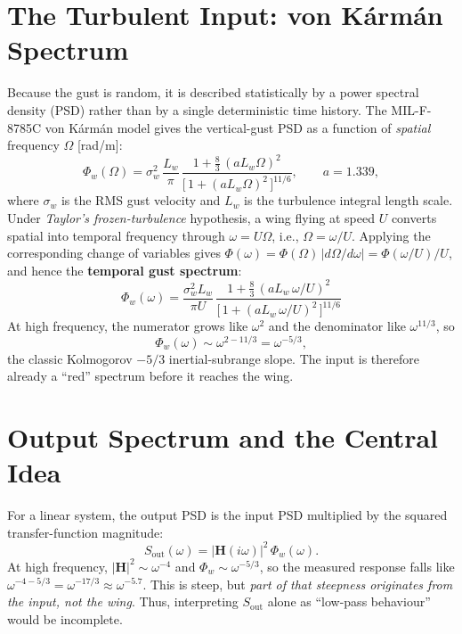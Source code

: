 \documentclass[11pt]{article}
\begin{document}
\section{The Turbulent Input: von K\'arm\'an Spectrum}
Because the gust is random, it is described statistically by a power spectral
density (PSD) rather than by a single deterministic time history. The MIL-F-8785C
von K\'arm\'an model gives the vertical-gust PSD as a function
of \emph{spatial} frequency $\Omega$ [rad/m]:
\begin{equation}
\Phi_w(\Omega)=\sigma_w^2\,\frac{L_w}{\pi}\,
\frac{1+\tfrac83\,(a L_w\Omega)^2}{\big[\,1+(a L_w\Omega)^2\,\big]^{11/6}},
\qquad a=1.339,
\label{eq:vk-space}
\end{equation}
where $\sigma_w$ is the RMS gust velocity and $L_w$ is the turbulence integral length scale. Under \emph{Taylor's frozen-turbulence} hypothesis, a wing flying at speed $U$ converts spatial
into temporal frequency through $\omega=U\Omega$, i.e., $\Omega=\omega/U$. Applying the corresponding change of variables gives
$\Phi(\omega)=\Phi(\Omega)\,|d\Omega/d\omega|=\Phi(\omega/U)/U$, and hence the
\textbf{temporal gust spectrum}:
\begin{equation}
\boxed{\;\Phi_w(\omega)=\frac{\sigma_w^2 L_w}{\pi U}\,
\frac{1+\tfrac83\,(a L_w\,\omega/U)^2}{\big[\,1+(a L_w\,\omega/U)^2\,\big]^{11/6}}\;}
\label{eq:vk-time}
\end{equation}
At high frequency, the numerator grows like $\omega^2$ and the denominator like
$\omega^{11/3}$, so
\begin{equation}
\Phi_w(\omega)\sim\omega^{2-11/3}=\omega^{-5/3},
\end{equation}
the classic Kolmogorov $-5/3$ inertial-subrange slope. The input is therefore already a
``red'' spectrum before it reaches the wing.

\section{Output Spectrum and the Central Idea}
For a linear system, the output PSD is the input PSD multiplied by the squared
transfer-function magnitude:
\begin{equation}
\boxed{\ S_{\mathrm{out}}(\omega) = \big|\mathbf H(i\omega)\big|^2\,\Phi_w(\omega).\ }
\label{eq:Sout}
\end{equation}
At high frequency, $|\mathbf H|^2\sim\omega^{-4}$ and $\Phi_w\sim\omega^{-5/3}$,
so the measured response falls like $\omega^{-4-5/3}=\omega^{-17/3}\approx
\omega^{-5.7}$. This is steep, but \emph{part of that steepness originates from the input,
not the wing}. Thus, interpreting $S_{\mathrm{out}}$ alone as ``low-pass behaviour'' would be incomplete.
\end{document}

